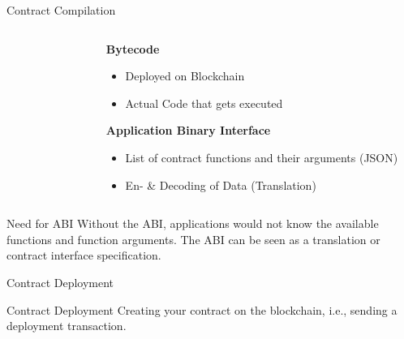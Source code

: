 \documentclass[]{beamer}
\begin{document}
\begin{frame}{Contract Compilation}

	\begin{figure}
		\begingroup
			
		\endgroup
	\end{figure}

	\begin{columns}
		\begin{column}{0.6\textwidth}
			\begin{figure}[h!]
				\center
					
			\end{figure}\vspace{1em}
		\end{column}
		
		\begin{column}{0.5\textwidth}
			\textbf{Bytecode}
				\begin{itemize}
					\item Deployed on Blockchain
					\item Actual Code that gets executed
				\end{itemize}
		\vspace{1em}
			\textbf{Application Binary Interface}
				\begin{itemize}
					\item List of contract functions and their arguments (JSON)
					\item En- \& Decoding of Data (Translation) 
				\end{itemize}
		\end{column}
	\end{columns}

	\begin{keytakeaway}{Need for ABI}
		 Without the ABI, applications would not know the available functions and function arguments. The ABI can be seen as a translation or contract interface specification.
	\end{keytakeaway}		

\end{frame}

\begin{frame}{Contract Deployment}

	\begin{figure}
		\begingroup
			
		\endgroup
	\end{figure}
		
	\begin{keytakeaway}{Contract Deployment}
		Creating your contract on the blockchain, i.e., sending a deployment transaction.
	\end{keytakeaway}
	
	\vspace{1.5em}
\end{frame}
\end{document}
